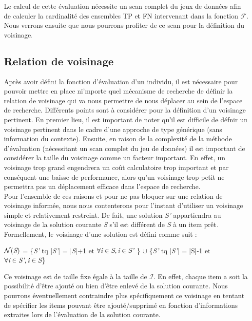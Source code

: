 \documentclass[a4paper,10pt]{report}
\begin{document}
Le calcul de cette évaluation nécessite un scan complet du jeux de données afin de calculer la cardinalité des ensembles TP et FN intervenant dans la fonction $\mathcal{F}$. Nous verrons ensuite que nous pourrons profiter de ce scan pour la définition du voisinage.

\subsection{Relation de voisinage}

	Après avoir défini la fonction d'évaluation d'un individu, il est nécessaire pour pouvoir mettre en place ni'mporte quel mécanisme de recherche de définir la relation de voisinage qui va nous permettre de nous déplacer au sein de l'espace de recherche. Différents points sont à considérer pour la définition d'un voisinage pertinent. En premier lieu, il est important de noter qu'il est difficile de défnir un voisinage pertinent dans le cadre d'une approche de type générique (sans information du contexte). Ensuite, en raison de la complexité de la méthode d'évaluation (nécessitant un scan complet du jeu de données) il est important de considérer la taille du voisinage comme un facteur important. En effet, un voisinage trop grand engendrera un coût calculatoire trop important et par conséquent une baisse de performance, alors qu'un voisinage trop petit ne permettra pas un déplacement efficace dans l'espace de recherche.\\
	
	Pour l'ensemble de ces raisons et pour ne pas bloquer sur une relation de voisinage informée, nous nous contenterons pour l'instant d'utiliser un voisinage simple et relativement restreint. De fait, une solution \emph{S'} appartiendra au voisinage de la solution courante \emph{S} s'il est différent de \emph{S} à un item prêt. Formellement, le voisinage d'une solution est défini comme suit : \\

\begin{center}
	$\mathcal{N}(\emph{S})$ = \{\emph{S'} tq |\emph{S'}| = |\emph{S}|+1 et $\forall \emph{i} \in \emph{S}, \emph{i} \in \emph{S'} $ \} $\cup$ \{\emph{S'} tq |\emph{S'}| = |S|-1 et $ \forall \emph{i} \in \emph{S'}, \emph{i} \in \emph{S}$\}   \\
\end{center}	

Ce voisinage est de taille fixe égale à la taille de $\mathcal{I}$. En effet, chaque item a soit la possibilité d'être ajouté ou bien d'être enlevé de la solution courante. Nous pourrons éventuellement contraindre plus spécifiquement ce voisinage en tentant de spécifier les items pouvant être ajouté/supprimé en fonction d'informations extraites lors de l'évaluation de la solution courante.
\end{document}
